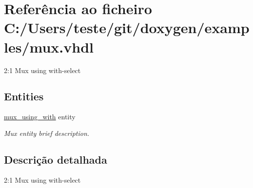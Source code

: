 \hypertarget{mux_8vhdl}{\section{Referência ao ficheiro C\-:/\-Users/teste/git/doxygen/examples/mux.vhdl}
\label{mux_8vhdl}
}


2\-:1 Mux using with-\/select  


\subsection*{Entities}
\begin{DoxyCompactItemize}
\item 
\hyperlink{classmux__using__with}{mux\-\_\-using\-\_\-with} entity
\begin{DoxyCompactList}\small\item\em Mux entity brief description. \end{DoxyCompactList}\end{DoxyCompactItemize}


\subsection{Descrição detalhada}
2\-:1 Mux using with-\/select 